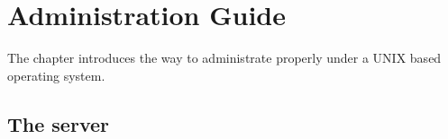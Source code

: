 

\newcommand{\mantitle}{\textsc{Administration}}


\tableofcontents

\chapter*{Administration Guide}

The chapter introduces the way to administrate properly \eyedb under
a UNIX based operating system.

\section{The \eyedb server}


